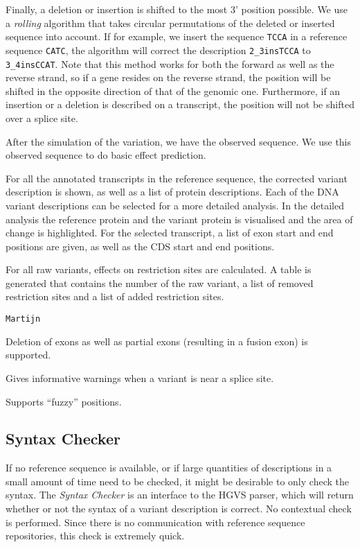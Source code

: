 \documentclass{article}
\begin{document}
Finally, a deletion or insertion is shifted to the most 3' position possible.
We use a \emph{rolling} algorithm that takes circular permutations of the
deleted  or inserted sequence into account. If for example, we insert the
sequence \texttt{TCCA} in a reference sequence \texttt{CATC}, the
algorithm will correct the description \texttt{2\_3insTCCA} to
\texttt{3\_4insCCAT}. Note that this method works for both the forward as well
as the reverse strand, so if a gene resides on the reverse strand, the position
will be shifted in the opposite direction of that of the genomic one.
Furthermore, if an insertion or a deletion is described on a transcript, the
position will not be shifted over a splice site.


After the simulation of the variation, we have the observed sequence. We use
this observed sequence to do basic effect prediction.

For all the annotated transcripts in the reference sequence, the corrected
variant description is shown, as well as a list of protein descriptions. Each
of the DNA variant descriptions can be selected for a more detailed analysis.
In the detailed analysis the reference protein and the variant protein is
visualised and the area of change is highlighted. For the selected transcript,
a list of exon start and end positions are given, as well as the CDS start and
end positions.

For all raw variants, effects on restriction sites are calculated. A table is
generated that contains the number of the raw variant, a list of removed
restriction sites and a list of added restriction sites.

\texttt{Martijn}

Deletion of exons as well as partial exons (resulting in a fusion exon) is
supported.

Gives informative warnings when a variant is near a splice site.

Supports ``fuzzy'' positions.

\subsection{Syntax Checker}
If no reference sequence is available, or if large quantities of
descriptions in a small amount of time need to be checked, it might be
desirable to only check the syntax. The \emph{Syntax Checker} is an interface
to the HGVS parser, which will return whether or not the syntax of a variant
description is correct. No contextual check is performed. Since there is no
communication with reference sequence repositories, this check is extremely
quick.
\end{document}
